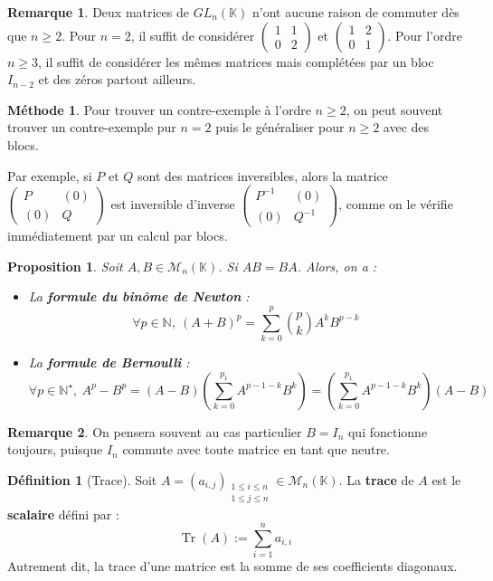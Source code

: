 \documentclass[french]{book}
\newcommand{\N}{\mathbb{N}}
\newcommand{\K}{\mathbb{K}}
\newcommand{\st}{^\star}
\newcommand{\inv}{^{-1}}
\theoremstyle{plain}
\newtheorem{prop}{Proposition}[chapter]
\theoremstyle{definition}
\newtheorem{dfn}{Définition}[chapter]
\newtheorem{rmq}{Remarque}[chapter]
\newtheorem{met}{Méthode}[chapter]
\theoremstyle{remark}
\DeclareMathOperator{\tr}{Tr}
\begin{document}
\begin{rmq}
	Deux matrices de $GL_n(\K)$ n'ont aucune raison de commuter dès que $n\geqslant2$. Pour $n=2$, il suffit de considérer $\displaystyle\begin{pmatrix}1&1\\0&2\end{pmatrix}$ et $\displaystyle\begin{pmatrix}1&2\\0&1\end{pmatrix}$. Pour l'ordre $n\geqslant3$, il suffit de considérer les mêmes matrices mais complétées par un bloc $I_{n-2}$ et des zéros partout ailleurs.
\end{rmq}
\begin{met}
	Pour trouver un contre-exemple à l'ordre $n\geqslant2$, on peut souvent trouver un contre-exemple pur $n=2$ puis le généraliser pour $n\geqslant2$ avec des blocs. \\ \par Par exemple, si $P$ et $Q$ sont des matrices inversibles, alors la matrice $\displaystyle\begin{pmatrix}P&(0)\\ (0)&Q\end{pmatrix}$ est inversible d'inverse $\displaystyle\begin{pmatrix}P\inv&(0)\\ (0)&Q\inv\end{pmatrix}$, comme on le vérifie immédiatement par un calcul par blocs. 
\end{met}
\begin{prop}
	Soit $A,B\in\mathcal{M}_n(\K)$. Si $AB=BA$. Alors, on a : \begin{itemize}
		\item La \textbf{formule du binôme de Newton} : $$\forall p\in\N,\ (A+B)^p=\sum_{k=0}^{p}\binom{p}{k}A^kB^{p-k}$$
		\item La \textbf{formule de Bernoulli} : $$\forall p\in\N\st,\ A^p-B^p=(A-B)\left(\sum_{k=0}^{p_1}A^{p-1-k}B^k\right)=\left(\sum_{k=0}^{p_1}A^{p-1-k}B^k\right)(A-B)$$
	\end{itemize}
\end{prop}
\begin{rmq}
	On pensera souvent au cas particulier $B=I_n$ qui fonctionne toujours, puisque $I_n$ commute avec toute matrice en tant que neutre.
\end{rmq}
\begin{dfn}[Trace]
	Soit $A=(a_{i,j})_{\substack{1\leqslant i\leqslant n\\ 1\leqslant j\leqslant n}}\in\mathcal{M}_n(\K)$. La \textbf{trace} de $A$ est le \textbf{scalaire} défini par : $$\tr(A):=\sum_{i=1}^{n}a_{i,i}$$ Autrement dit, la trace d'une matrice est la somme de ses coefficients diagonaux.
\end{dfn}
\end{document}
